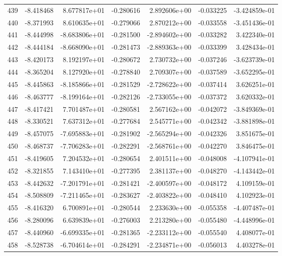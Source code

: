 \begin{tabular}{rrrrrrr}
 439 &  -8.418468 &  8.677817e+01 & -0.280616 &  2.892606e+00 &  -0.033225 & -3.424859e-01 \\
 440 &  -8.371993 &  8.610635e+01 & -0.279066 &  2.870212e+00 &  -0.033558 & -3.451436e-01 \\
 441 &  -8.444998 & -8.683806e+01 & -0.281500 & -2.894602e+00 &  -0.033282 &  3.422340e-01 \\
 442 &  -8.444184 & -8.668090e+01 & -0.281473 & -2.889363e+00 &  -0.033399 &  3.428434e-01 \\
 443 &  -8.420173 &  8.192197e+01 & -0.280672 &  2.730732e+00 &  -0.037246 & -3.623739e-01 \\
 444 &  -8.365204 &  8.127920e+01 & -0.278840 &  2.709307e+00 &  -0.037589 & -3.652295e-01 \\
 445 &  -8.445863 & -8.185866e+01 & -0.281529 & -2.728622e+00 &  -0.037414 &  3.626251e-01 \\
 446 &  -8.463777 & -8.199164e+01 & -0.282126 & -2.733055e+00 &  -0.037372 &  3.620332e-01 \\
 447 &  -8.417421 &  7.701487e+01 & -0.280581 &  2.567162e+00 &  -0.042072 & -3.849369e-01 \\
 448 &  -8.330521 &  7.637312e+01 & -0.277684 &  2.545771e+00 &  -0.042342 & -3.881898e-01 \\
 449 &  -8.457075 & -7.695883e+01 & -0.281902 & -2.565294e+00 &  -0.042326 &  3.851675e-01 \\
 450 &  -8.468737 & -7.706283e+01 & -0.282291 & -2.568761e+00 &  -0.042270 &  3.846475e-01 \\
 451 &  -8.419605 &  7.204532e+01 & -0.280654 &  2.401511e+00 &  -0.048008 & -4.107941e-01 \\
 452 &  -8.321855 &  7.143410e+01 & -0.277395 &  2.381137e+00 &  -0.048270 & -4.143442e-01 \\
 453 &  -8.442632 & -7.201791e+01 & -0.281421 & -2.400597e+00 &  -0.048172 &  4.109159e-01 \\
 454 &  -8.508809 & -7.211465e+01 & -0.283627 & -2.403822e+00 &  -0.048410 &  4.102923e-01 \\
 455 &  -8.416320 &  6.700891e+01 & -0.280544 &  2.233630e+00 &  -0.055358 & -4.407487e-01 \\
 456 &  -8.280096 &  6.639839e+01 & -0.276003 &  2.213280e+00 &  -0.055480 & -4.448996e-01 \\
 457 &  -8.440960 & -6.699335e+01 & -0.281365 & -2.233112e+00 &  -0.055540 &  4.408077e-01 \\
 458 &  -8.528738 & -6.704614e+01 & -0.284291 & -2.234871e+00 &  -0.056013 &  4.403278e-01 \\

\end{tabular}
